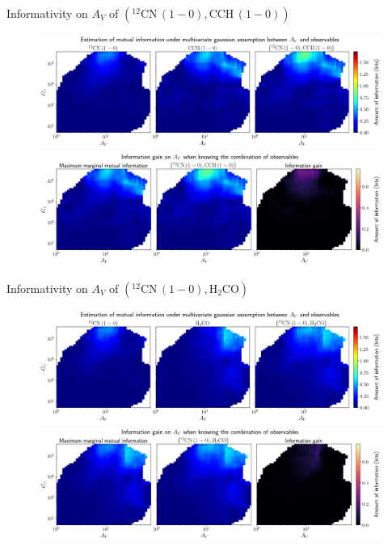 \documentclass{beamer}
\begin{document}
\begin{frame}{Informativity on $A_V$ of $\left(\mathrm{^{12}CN\,(1-0)},\mathrm{CCH\,(1-0)}\right)$}
    \begin{figure}
        \centering
        \includegraphics[width=0.95\linewidth]{../linearinfogauss/av__12cn10_cch10_linearinfogauss.png}
        \vfill
        \includegraphics[width=0.95\linewidth]{../linearinfogauss/av__12cn10_cch10_linearinfogauss_gain.png}
    \end{figure}
\end{frame}

\begin{frame}{Informativity on $A_V$ of $\left(\mathrm{^{12}CN\,(1-0)},\mathrm{H_2CO}\right)$}
    \begin{figure}
        \centering
        \includegraphics[width=0.95\linewidth]{../linearinfogauss/av__12cn10_h2co_linearinfogauss.png}
        \vfill
        \includegraphics[width=0.95\linewidth]{../linearinfogauss/av__12cn10_h2co_linearinfogauss_gain.png}
    \end{figure}
\end{frame}
\end{document}
